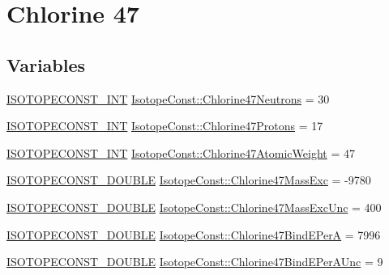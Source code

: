 \hypertarget{group___isotope_const-_chlorine-_cl47}{}\section{Chlorine 47}
\label{group___isotope_const-_chlorine-_cl47}
\subsection*{Variables}
\begin{DoxyCompactItemize}
\item 
\mbox{\hyperlink{group___isotope_const-_macros_ga5f18360b3e99483a35c32d789e62621c}{I\+S\+O\+T\+O\+P\+E\+C\+O\+N\+S\+T\+\_\+\+I\+NT}} \mbox{\hyperlink{group___isotope_const-_chlorine-_cl47_gac64dc04f28a2438dd978661682c9d1b1}{Isotope\+Const\+::\+Chlorine47\+Neutrons}} = 30
\item 
\mbox{\hyperlink{group___isotope_const-_macros_ga5f18360b3e99483a35c32d789e62621c}{I\+S\+O\+T\+O\+P\+E\+C\+O\+N\+S\+T\+\_\+\+I\+NT}} \mbox{\hyperlink{group___isotope_const-_chlorine-_cl47_ga5289625520db12668aa0304a3d741c0e}{Isotope\+Const\+::\+Chlorine47\+Protons}} = 17
\item 
\mbox{\hyperlink{group___isotope_const-_macros_ga5f18360b3e99483a35c32d789e62621c}{I\+S\+O\+T\+O\+P\+E\+C\+O\+N\+S\+T\+\_\+\+I\+NT}} \mbox{\hyperlink{group___isotope_const-_chlorine-_cl47_ga8879f472bd3e46d38fca6c4eaa67e1d0}{Isotope\+Const\+::\+Chlorine47\+Atomic\+Weight}} = 47
\item 
\mbox{\hyperlink{group___isotope_const-_macros_ga8f45a7272ce02c0b4c65c44636ed719a}{I\+S\+O\+T\+O\+P\+E\+C\+O\+N\+S\+T\+\_\+\+D\+O\+U\+B\+LE}} \mbox{\hyperlink{group___isotope_const-_chlorine-_cl47_ga96b07a510888d36cb90a3a2191b9472c}{Isotope\+Const\+::\+Chlorine47\+Mass\+Exc}} = -\/9780
\item 
\mbox{\hyperlink{group___isotope_const-_macros_ga8f45a7272ce02c0b4c65c44636ed719a}{I\+S\+O\+T\+O\+P\+E\+C\+O\+N\+S\+T\+\_\+\+D\+O\+U\+B\+LE}} \mbox{\hyperlink{group___isotope_const-_chlorine-_cl47_ga650b93c2f0ec50f49e552e1968da1654}{Isotope\+Const\+::\+Chlorine47\+Mass\+Exc\+Unc}} = 400
\item 
\mbox{\hyperlink{group___isotope_const-_macros_ga8f45a7272ce02c0b4c65c44636ed719a}{I\+S\+O\+T\+O\+P\+E\+C\+O\+N\+S\+T\+\_\+\+D\+O\+U\+B\+LE}} \mbox{\hyperlink{group___isotope_const-_chlorine-_cl47_ga03cfa047100a190be14eb75718eb421d}{Isotope\+Const\+::\+Chlorine47\+Bind\+E\+PerA}} = 7996
\item 
\mbox{\hyperlink{group___isotope_const-_macros_ga8f45a7272ce02c0b4c65c44636ed719a}{I\+S\+O\+T\+O\+P\+E\+C\+O\+N\+S\+T\+\_\+\+D\+O\+U\+B\+LE}} \mbox{\hyperlink{group___isotope_const-_chlorine-_cl47_ga7e409a45cde355e46f72312b1a5f678c}{Isotope\+Const\+::\+Chlorine47\+Bind\+E\+Per\+A\+Unc}} = 9

\end{DoxyCompactItemize}
